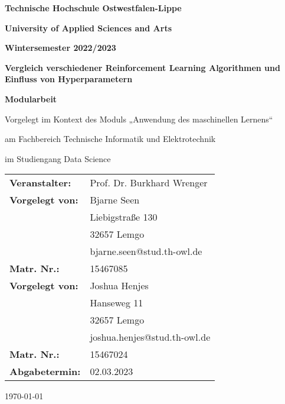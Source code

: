 \documentclass[../documentation.tex]{subfiles}
\begin{document}
\begin{titlepage}
    \begin{center}   
    {\textbf{Technische Hochschule Ostwestfalen-Lippe}}\\
    {\textbf{University of Applied Sciences and Arts}\par}\vspace{1.5cm}
    {\Large\bfseries Wintersemester 2022/2023\par}\vspace{1.5cm}
    {\huge\bfseries Vergleich verschiedener Reinforcement Learning Algorithmen und Einfluss von Hyperparametern \par}
    \vspace{1.5cm}
    {\Large\bfseries Modularbeit}\\
    {\large Vorgelegt im Kontext des Moduls „Anwendung des maschinellen Lernens“\par} \vspace{1cm}
    {\large am Fachbereich Technische Informatik und Elektrotechnik}\\
    {\large im Studiengang Data Science\par} \vspace{2cm}
    \end{center}
    \vfill
    \begin{tabular}{l l}
    \textbf{Veranstalter:}& {Prof. Dr. Burkhard Wrenger}\\ 
    \textbf{Vorgelegt von:}& {Bjarne Seen}\\ 
    \textbf{} & {Liebigstraße 130} \\
    \textbf{} & {32657 Lemgo} \\
    \textbf{} & {bjarne.seen@stud.th-owl.de} \\
    \textbf{Matr. Nr.:} & {15467085} \\
    \textbf{Vorgelegt von:}& {Joshua Henjes}\\ 
    \textbf{} & {Hanseweg 11} \\
    \textbf{} & {32657 Lemgo} \\
    \textbf{} & {joshua.henjes@stud.th-owl.de} \\
    \textbf{Matr. Nr.:} & {15467024} \\
    \textbf{Abgabetermin:} & {02.03.2023} 
    \end{tabular}   
    \begin{center}
    \vfill

    {\large\today\par}
    \end{center}
\end{titlepage}
\end{document}
